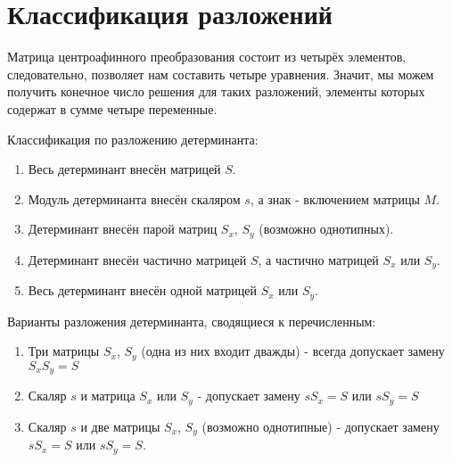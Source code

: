 \section{Классификация разложений}

Матрица центроафинного преобразования состоит из четырёх элементов, следовательно, позволяет нам составить четыре уравнения. Значит, мы можем получить конечное число решения для таких разложений, элементы которых содержат в сумме четыре переменные.

Классификация по разложению детерминанта:

\begin{enumerate}
\item Весь детерминант внесён матрицей $S$.
\item Модуль детерминанта внесён скаляром $s$, а знак - включением матрицы $M$.
\item Детерминант внесён парой матриц $S_x$, $S_y$ (возможно однотипных).
\item Детерминант внесён частично матрицей $S$, а частично матрицей $S_x$ или $S_y$.
\item Весь детерминант внесён одной матрицей $S_x$ или $S_y$.
\end{enumerate}

Варианты разложения детерминанта, сводящиеся к перечисленным:
\begin{enumerate}
\item Три матрицы $S_x$, $S_y$ (одна из них входит дважды) - всегда допускает замену $S_x S_y = S$
\item Скаляр $s$ и матрица $S_x$ или $S_y$ - допускает замену $s S_x = S$ или $s S_y = S$
\item Скаляр $s$ и две матрицы $S_x$, $S_y$ (возможно однотипные) - допускает замену $s S_x = S$ или $s S_y = S$.
\end{enumerate}


